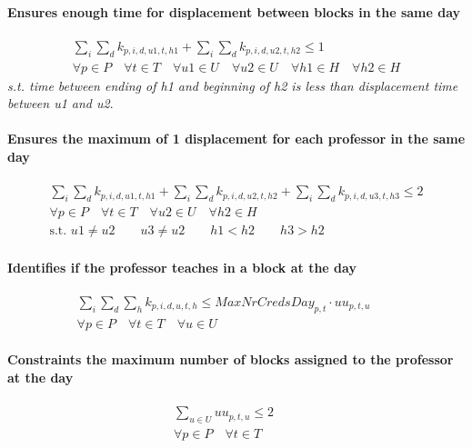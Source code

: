 \paragraph{Ensures enough time for displacement between blocks in the same day}
\begin{eqnarray}
\sum\limits_{i} \sum\limits_{d} k_{p,i,d,u1,t,h1} + \sum\limits_{i} \sum\limits_{d} k_{p,i,d,u2,t,h2} \le 1 \nonumber
\\
\forall p \in P \quad
\forall t \in T \quad
\forall u1 \in U \quad
\forall u2 \in U \quad
\forall h1 \in H \quad
\forall h2 \in H \nonumber
\end{eqnarray}	
\textit{s.t. time between ending of h1 and beginning of h2 is less than displacement time between u1 and u2}.

\paragraph{Ensures the maximum of 1 displacement for each professor in the same day}
\begin{eqnarray}
\sum\limits_{i} \sum\limits_{d} k_{p,i,d,u1,t,h1} + \sum\limits_{i} \sum\limits_{d} k_{p,i,d,u2,t,h2} + \sum\limits_{i} \sum\limits_{d} k_{p,i,d,u3,t,h3} \le 2 \nonumber
\\
\forall p \in P \quad
\forall t \in T \quad
\forall u2 \in U \quad
\forall h2 \in H \nonumber
\\
\mbox{s.t. }u1 \neq u2 \qquad u3 \neq u2 \qquad h1<h2 \qquad h3>h2 \nonumber
\end{eqnarray}

\paragraph{Identifies if the professor teaches in a block at the day}
\begin{eqnarray}
\sum\limits_{i} \sum\limits_{d} \sum\limits_{h} k_{p,i,d,u,t,h} \le MaxNrCredsDay_{p,t} \cdot uu_{p,t,u} \nonumber \qquad
\\
\forall p \in P \quad
\forall t \in T \quad
\forall u \in U \quad \nonumber
\end{eqnarray}

\paragraph{Constraints the maximum number of blocks assigned to the professor at the day}
\begin{eqnarray}
\sum\limits_{u \in U} uu_{p,t,u} \le 2 \nonumber \qquad
\\
\forall p \in P \quad
\forall t \in T \quad \nonumber
\end{eqnarray}

